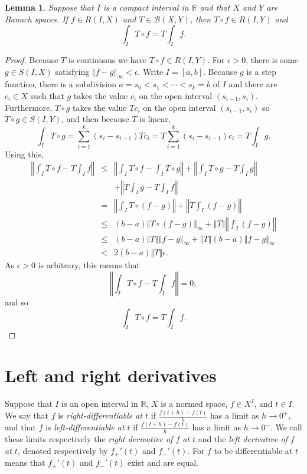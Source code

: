 \documentclass{article}
\newcommand{\norm}[1]{\left\Vert #1 \right\Vert}
\newtheorem{lemma}[theorem]{Lemma}
\theoremstyle{definition}
\begin{document}
\begin{lemma}
Suppose that $I$ is a compact interval in $\mathbb{R}$ and that $X$ and $Y$ are Banach spaces.
If $f \in R(I,X)$ and $T \in \mathscr{B}(X,Y)$, then $T \circ f \in R(I,Y)$ and 
\[
\int_I T \circ f = T \int_I f.
\]
\end{lemma}
\begin{proof}
Because $T$ is continuous we have $T \circ f \in R(I,Y)$. For $\epsilon>0$, there is some
$g \in S(I,X)$ satisfying $\norm{f - g}_\infty<\epsilon$. Write $I=[a,b]$.
Because $g$ is a step function, there is a subdivision $a=s_0<s_1<\cdots<s_k=b$ of $I$
and there are $c_i \in X$ such that $g$ takes the value $c_i$ on the open interval $(s_{i-1},s_i)$.
Furthermore, $T \circ g$ takes the value $Tc_i$ on the open interval $(s_{i-1},s_i)$ so $T \circ g \in
S(I,Y)$, and then because $T$ is linear,
\[
\int_I T \circ g = \sum_{i=1}^k (s_i-s_{i-1}) Tc_i =
T \sum_{i=1}^k (s_i-s_{i-1})c_i = T \int_I g.  
\]
Using this,
\begin{eqnarray*}
\norm{\int_I T \circ f - T \int_I f} &\leq& \norm{\int_I T \circ f - \int_I T \circ g} + \norm{\int_I T \circ g - T \int_I g}\\
&&+\norm{T \int_I g - T \int_I f}\\
&=&\norm{\int_I T \circ (f-g) } + \norm{T \int_I (f-g)}\\
&\leq&(b-a) \norm{T \circ (f-g) }_\infty + \norm{T} \norm{\int_I (f-g)}\\
&\leq&(b-a) \norm{T} \norm{f-g}_\infty + \norm{T} (b-a) \norm{f-g}_\infty\\
&<&2(b-a)\norm{T} \epsilon.
\end{eqnarray*}
As $\epsilon>0$ is arbitrary, this means that
\[
\norm{\int_I T \circ f - T \int_I f} = 0,
\]
and so
\[
\int_I T \circ f = T \int_I f.
\]
\end{proof}


\section{Left and right derivatives}
Suppose that $I$ is an open interval in $\mathbb{R}$, $X$ is a normed space,
$f \in X^I$, and $t \in I$. We say that $f$ is {\em right-differentiable at $t$} if
$\frac{f(t+h)-f(t)}{h}$ has a limit as $h \to 0^+$, and that $f$ is {\em left-differentiable at $t$} if
$\frac{f(t+h)-f(t)}{h}$ has a limit as $h \to 0^-$. 
We call these limits respectively the {\em right derivative of $f$ at $t$} and the {\em left derivative of $f$ at $t$},
denoted respectively by
$f_+'(t)$ and $f_-'(t)$. For $f$ to be differentiable at $t$ means that $f_+'(t)$ and $f_-'(t)$ exist and are equal.
\end{document}
